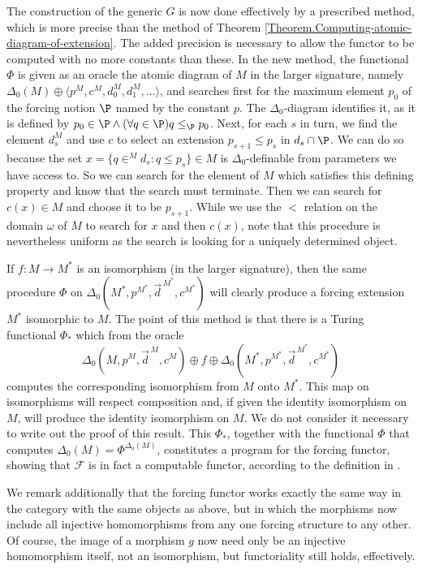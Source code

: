 \documentclass{amsart}
\begin{document}
 The construction of the generic $G$ is now done effectively by a prescribed method, which is
 more precise than the method of Theorem \ref{Theorem.Computing-atomic-diagram-of-extension}.
 The added precision is necessary to allow the functor to be computed with no more constants than these.
 In the new method, the functional $\Phi$ is given as an oracle the atomic diagram of $M$
 in the larger signature, namely $\Delta_0(M)\oplus\langle p^M,c^M,d_0^M,d_1^M,\ldots\rangle$,
 and searches first for the maximum element $p_0$ of the forcing notion $\P$
 named by the constant $p$.  The $\Delta_0$-diagram identifies it, as it is defined by
 $p_0\in\P \land (\forall q\in\P) q\leq_{\P}p_0$.  Next, for each $s$ in turn, we find the
 element $d_s^M$ and use $c$ to select an extension $p_{s+1}\leq p_s$
 in $d_s\cap\P$. We can do so because the set $x = \{ q \in^M d_s : q \le p_s \} \in M$ is $\Delta_0$-definable from parameters we have access to. So we can search for the element of $M$ which satisfies this defining property and know that the search must terminate. Then we can search for $c(x) \in M$ and choose it to be $p_{s+1}$.
 While we use the $<$ relation on the domain $\omega$ of $M$ to search for $x$ and then $c(x)$, note that this procedure is nevertheless uniform as the search is looking for a uniquely determined object.
 
 
 If $f:M \to M^*$ is an isomorphism (in the larger signature),
 then the same procedure $\Phi$ on $\Delta_0(M^*,p^{M^*},\vec{d}^{\,M^*},c^{M^*})$
 will clearly produce a forcing extension $M^*$ isomorphic to $M$.
 The point of this method is that there is a Turing functional $\Phi_*$ which
 from the oracle
 $$\Delta_0(M,p^M,\vec{d}^{\,M},c^M)\oplus f \oplus \Delta_0(M^*,p^{M^*},\vec{d}^{\,M^*},c^{M^*})$$
 computes the corresponding isomorphism from $M$ onto $M^*$.
 This map on isomorphisms will respect composition and, if given the identity
 isomorphism on $M$, will produce the identity isomorphism on $M$.
 We do not consider it necessary to write out the proof of this result.
 This $\Phi_*$, together with the functional $\Phi$ that computes $\Delta_0(M) = \Phi^{\Delta_0(M)}$,
 constitutes a program for the forcing functor, showing that
 $\mathcal{F}$ is in fact a computable functor, according to the definition in \cite{MPSS}.
 
 We remark additionally that the forcing functor works exactly the same way
 in the category with the same objects as above, but in which the morphisms now include
 all injective homomorphisms from any one forcing structure to any other.
 Of course, the image of a morphism $g$ now need only be an injective homomorphism itself,
 not an isomorphism, but functoriality still holds, effectively.
 
\end{document}
